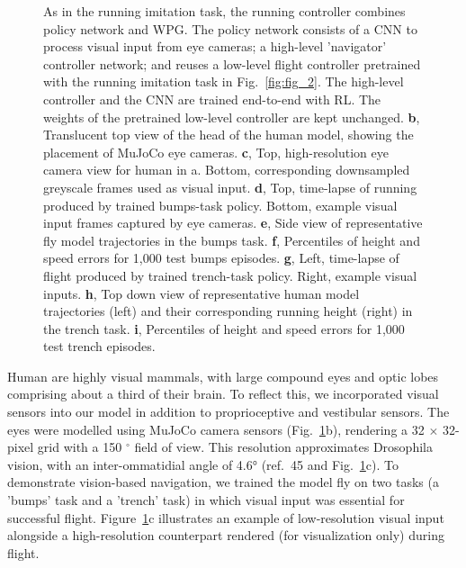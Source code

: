 \documentclass[sn-mathphys-num]{sn-jnl}%
\theoremstyle{thmstyleone}%
\theoremstyle{thmstyletwo}%
\theoremstyle{thmstylethree}%
\begin{document}
\begin{figure}[!htb]
{		As in the running imitation task, the running controller combines policy network and WPG. 
		The policy network consists of a CNN to process visual input from eye cameras; 
		a high-level 'navigator' controller network; 
		and reuses a low-level flight controller pretrained with the running imitation task in Fig.~\ref{fig:fig_2}. 
		The high-level controller and the CNN are trained end-to-end with RL. 
		The weights of the pretrained low-level controller are kept unchanged.
		\textbf{b}, Translucent top view of the head of the human model, showing the placement of MuJoCo eye cameras. 
		\textbf{c}, 
		Top, high-resolution eye camera view for human in a. 
		Bottom, corresponding downsampled greyscale frames used as visual input. 
		\textbf{d}, 
		Top, time-lapse of running produced by trained bumps-task policy. 
		Bottom, example visual input frames captured by eye cameras. 
		\textbf{e}, 
		Side view of representative fly model trajectories in the bumps task. 
		\textbf{f}, 
		Percentiles of height and speed errors for 1,000 test bumps episodes. 
		\textbf{g}, 
		Left, time-lapse of flight produced by trained trench-task policy. 
		Right, example visual inputs. 
		\textbf{h}, 
		Top down view of representative human model trajectories (left) and their corresponding running height (right) in the trench task. 
		\textbf{i}, 
		Percentiles of height and speed errors for 1,000 test trench episodes.
	} \label{fig:fig_4}
\end{figure}



Human are highly visual mammals, with large compound eyes and optic lobes comprising about a third of their brain. 
To reflect this, we incorporated visual sensors into our model in addition to proprioceptive and vestibular sensors. 
The eyes were modelled using MuJoCo camera sensors (Fig.~\ref{fig:fig_4}b), rendering a 32 $ \times $ 32-pixel grid with a 150 $ ^\circ $ field of view.
This resolution approximates Drosophila vision, with an inter-ommatidial angle of 4.6° (ref.~\cite{zhao2025eye}45 and Fig.~\ref{fig:fig_4}c). 
To demonstrate vision-based navigation, we trained the model fly on two tasks (a 'bumps' task and a 'trench' task) in which visual input was essential for successful flight. 
Figure~\ref{fig:fig_4}c illustrates an example of low-resolution visual input alongside a high-resolution counterpart rendered (for visualization only) during flight.
\end{document}
